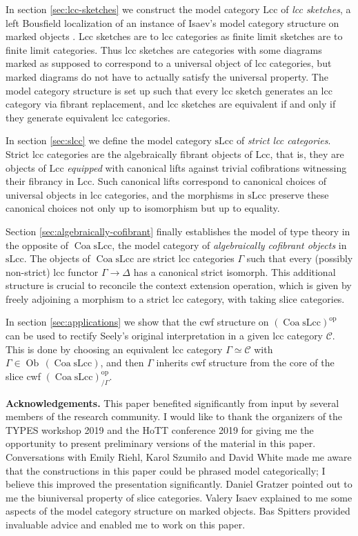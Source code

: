 \documentclass[a4paper]{article}
\theoremstyle{remark}
\theoremstyle{definition}
\begin{document}
In section \ref{sec:lcc-sketches} we construct the model category $\mathrm{Lcc}$ of \emph{lcc sketches}, a left Bousfield localization of an instance of Isaev's model category structure on marked objects \cite{marked-objects}.
Lcc sketches are to lcc categories as finite limit sketches are to finite limit categories.
Thus lcc sketches are categories with some diagrams marked as supposed to correspond to a universal object of lcc categories, but marked diagrams do not have to actually satisfy the universal property.
The model category structure is set up such that every lcc sketch generates an lcc category via fibrant replacement, and lcc sketches are equivalent if and only if they generate equivalent lcc categories.

In section \ref{sec:slcc} we define the model category $\mathrm{sLcc}$ of \emph{strict lcc categories}.
Strict lcc categories are the algebraically fibrant objects of $\mathrm{Lcc}$, that is, they are objects of $\mathrm{Lcc}$ \emph{equipped} with canonical lifts against trivial cofibrations witnessing their fibrancy in $\mathrm{Lcc}$.
Such canonical lifts correspond to canonical choices of universal objects in lcc categories, and the morphisms in $\mathrm{sLcc}$ preserve these canonical choices not only up to isomorphism but up to equality.

Section \ref{sec:algebraically-cofibrant} finally establishes the model of type theory in the opposite of $\operatorname{Coa} \mathrm{sLcc}$, the model category of \emph{algebraically cofibrant objects} in $\mathrm{sLcc}$.
The objects of $\operatorname{Coa} \mathrm{sLcc}$ are strict lcc categories $\Gamma$ such that every (possibly non-strict) lcc functor $\Gamma \rightarrow \Delta$ has a canonical strict isomorph.
This additional structure is crucial to reconcile the context extension operation, which is given by freely adjoining a morphism to a strict lcc category, with taking slice categories.

In section \ref{sec:applications} we show that the cwf structure on $(\operatorname{Coa} \mathrm{sLcc})^\mathrm{op}$ can be used to rectify Seely's original interpretation in a given lcc category $\mathcal{C}$.
This is done by choosing an equivalent lcc category $\Gamma \simeq \mathcal{C}$ with $\Gamma \in \operatorname{Ob} \, (\operatorname{Coa} \mathrm{sLcc})$, and then $\Gamma$ inherits cwf structure from the core of the slice cwf $(\operatorname{Coa} \mathrm{sLcc})^\mathrm{op}_{ / \Gamma}$.

\textbf{Acknowledgements.}
This paper benefited significantly from input by several members of the research community.
I would like to thank the organizers of the TYPES workshop 2019 and the HoTT conference 2019 for giving me the opportunity to present preliminary versions of the material in this paper.
Conversations with Emily Riehl, Karol Szumiło and David White made me aware that the constructions in this paper could be phrased model categorically; I believe this improved the presentation significantly.
Daniel Gratzer pointed out to me the biuniversal property of slice categories.
Valery Isaev explained to me some aspects of the model category structure on marked objects.
Bas Spitters provided invaluable advice and enabled me to work on this paper.
\end{document}
